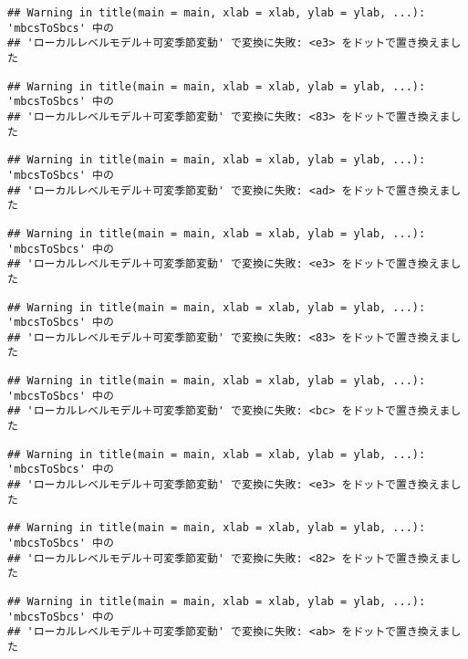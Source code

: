 \documentclass[]{article}
\begin{document}
\begin{verbatim}
## Warning in title(main = main, xlab = xlab, ylab = ylab, ...): 'mbcsToSbcs' 中の
## 'ローカルレベルモデル＋可変季節変動' で変換に失敗: <e3> をドットで置き換えました
\end{verbatim}

\begin{verbatim}
## Warning in title(main = main, xlab = xlab, ylab = ylab, ...): 'mbcsToSbcs' 中の
## 'ローカルレベルモデル＋可変季節変動' で変換に失敗: <83> をドットで置き換えました
\end{verbatim}

\begin{verbatim}
## Warning in title(main = main, xlab = xlab, ylab = ylab, ...): 'mbcsToSbcs' 中の
## 'ローカルレベルモデル＋可変季節変動' で変換に失敗: <ad> をドットで置き換えました
\end{verbatim}

\begin{verbatim}
## Warning in title(main = main, xlab = xlab, ylab = ylab, ...): 'mbcsToSbcs' 中の
## 'ローカルレベルモデル＋可変季節変動' で変換に失敗: <e3> をドットで置き換えました
\end{verbatim}

\begin{verbatim}
## Warning in title(main = main, xlab = xlab, ylab = ylab, ...): 'mbcsToSbcs' 中の
## 'ローカルレベルモデル＋可変季節変動' で変換に失敗: <83> をドットで置き換えました
\end{verbatim}

\begin{verbatim}
## Warning in title(main = main, xlab = xlab, ylab = ylab, ...): 'mbcsToSbcs' 中の
## 'ローカルレベルモデル＋可変季節変動' で変換に失敗: <bc> をドットで置き換えました
\end{verbatim}

\begin{verbatim}
## Warning in title(main = main, xlab = xlab, ylab = ylab, ...): 'mbcsToSbcs' 中の
## 'ローカルレベルモデル＋可変季節変動' で変換に失敗: <e3> をドットで置き換えました
\end{verbatim}

\begin{verbatim}
## Warning in title(main = main, xlab = xlab, ylab = ylab, ...): 'mbcsToSbcs' 中の
## 'ローカルレベルモデル＋可変季節変動' で変換に失敗: <82> をドットで置き換えました
\end{verbatim}

\begin{verbatim}
## Warning in title(main = main, xlab = xlab, ylab = ylab, ...): 'mbcsToSbcs' 中の
## 'ローカルレベルモデル＋可変季節変動' で変換に失敗: <ab> をドットで置き換えました
\end{verbatim}
\end{document}
